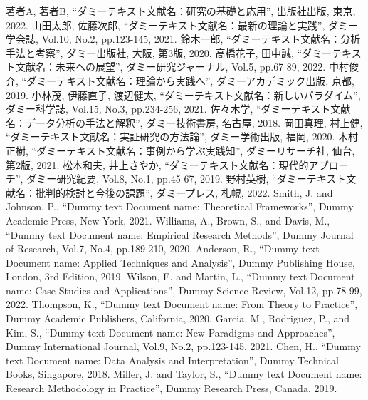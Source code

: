 \documentclass{cuxarticle}
\begin{document}
\newpage
\renewcommand{\refname}{\huge 参考文献}

\begin{thebibliography}{99}
   著者A, 著者B, ``ダミーテキスト文献名：研究の基礎と応用'', 出版社出版, 東京, 2022.
   山田太郎, 佐藤次郎, ``ダミーテキスト文献名：最新の理論と実践'', ダミー学会誌, Vol.10, No.2, pp.123-145, 2021.
   鈴木一郎, ``ダミーテキスト文献名：分析手法と考察'', ダミー出版社, 大阪, 第3版, 2020.
   高橋花子, 田中誠, ``ダミーテキスト文献名：未来への展望'', ダミー研究ジャーナル, Vol.5, pp.67-89, 2022.
   中村俊介, ``ダミーテキスト文献名：理論から実践へ'', ダミーアカデミック出版, 京都, 2019.
   小林茂, 伊藤直子, 渡辺健太, ``ダミーテキスト文献名：新しいパラダイム'', ダミー科学誌, Vol.15, No.3, pp.234-256, 2021.
   佐々木学, ``ダミーテキスト文献名：データ分析の手法と解釈'', ダミー技術書房, 名古屋, 2018.
   岡田真理, 村上健, ``ダミーテキスト文献名：実証研究の方法論'', ダミー学術出版, 福岡, 2020.
   木村正樹, ``ダミーテキスト文献名：事例から学ぶ実践知'', ダミーリサーチ社, 仙台, 第2版, 2021.
   松本和夫, 井上さやか, ``ダミーテキスト文献名：現代的アプローチ'', ダミー研究紀要, Vol.8, No.1, pp.45-67, 2019.
   野村英樹, ``ダミーテキスト文献名：批判的検討と今後の課題'', ダミープレス, 札幌, 2022.
   Smith, J. and Johnson, P., ``Dummy text Document name: Theoretical Frameworks'', Dummy Academic Press, New York, 2021.
   Williams, A., Brown, S., and Davis, M., ``Dummy text Document name: Empirical Research Methods'', Dummy Journal of Research, Vol.7, No.4, pp.189-210, 2020.
   Anderson, R., ``Dummy text Document name: Applied Techniques and Analysis'', Dummy Publishing House, London, 3rd Edition, 2019.
   Wilson, E. and Martin, L., ``Dummy text Document name: Case Studies and Applications'', Dummy Science Review, Vol.12, pp.78-99, 2022.
   Thompson, K., ``Dummy text Document name: From Theory to Practice'', Dummy Academic Publishers, California, 2020.
   Garcia, M., Rodriguez, P., and Kim, S., ``Dummy text Document name: New Paradigms and Approaches'', Dummy International Journal, Vol.9, No.2, pp.123-145, 2021.
   Chen, H., ``Dummy text Document name: Data Analysis and Interpretation'', Dummy Technical Books, Singapore, 2018.
   Miller, J. and Taylor, S., ``Dummy text Document name: Research Methodology in Practice'', Dummy Research Press, Canada, 2019.
\end{thebibliography}
\end{document}
